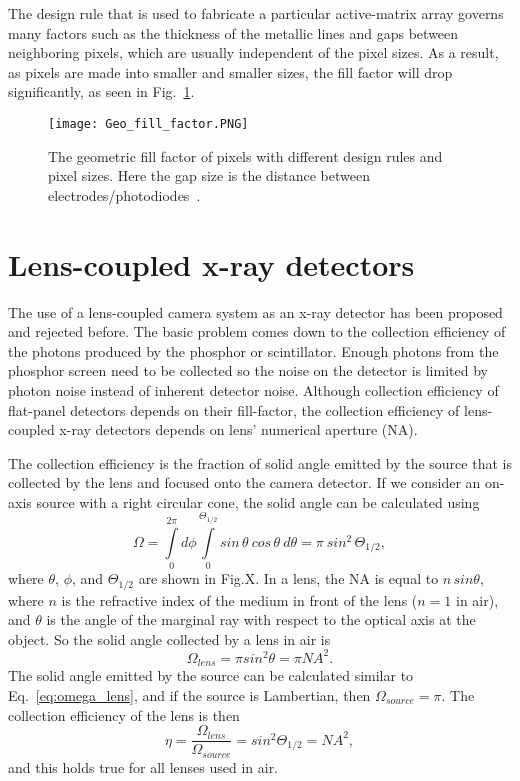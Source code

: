 The design rule that is used to fabricate a particular active-matrix array governs many factors such as the thickness of the metallic lines and gaps between neighboring pixels, which are usually independent of the pixel sizes.  As a result, as pixels are made into smaller and smaller sizes, the fill factor will drop significantly, as seen in Fig.~\ref{fig:fill_factor}.

\begin{figure}[ht]
\texttt{[image: Geo\_fill\_factor.PNG]}
\caption[]{The geometric fill factor of pixels with different design rules and pixel sizes.  Here the gap size is the distance between electrodes/photodiodes\footnotemark ~\citep{Rowlands2000}.}
\label{fig:fill_factor}
\end{figure}

\section{Lens-coupled x-ray detectors}
The use of a lens-coupled camera system as an x-ray detector has been proposed and rejected before.  The basic problem comes down to the collection efficiency of the photons produced by the phosphor or scintillator.  Enough photons from the phosphor screen need to be collected so the noise on the detector is limited by photon noise instead of inherent detector noise.  Although collection efficiency of flat-panel detectors depends on their fill-factor, the collection efficiency of lens-coupled x-ray detectors depends on lens' numerical aperture (NA).

The collection efficiency is the fraction of solid angle emitted by the source that is collected by the lens and focused onto the camera detector.  If we consider an on-axis source with a right circular cone, the solid angle can be calculated using
%
\begin{equation}
\label{eq:omega_lens}
\Omega = \int\limits_0^{2\pi} d \phi 
				\int\limits_0^{\Theta_{1/2}} sin \, \theta \ cos\, \theta \ d\theta = \pi \ sin^2 \, \Theta_{1/2},
\end{equation}
%
where $\theta$, $\phi$, and $\Theta_{1/2}$ are shown in Fig.X.  In a lens, the NA is equal to $n \, sin \theta$, where $n$ is the refractive index of the medium in front of the lens ($n = 1$ in air), and $\theta$ is the angle of the marginal ray with respect to the optical axis at the object.  So the solid angle collected by a lens in air is
%
\begin{equation}
\Omega_{lens} = \pi sin^2 \theta = \pi NA^2.
\end{equation}
%
The solid angle emitted by the source can be calculated similar to Eq.~\ref{eq:omega_lens}, and if the source is Lambertian, then $\Omega_{source} =  \pi$.  The collection efficiency of the lens is then
%
\begin{equation}
\label{eq:lens_collection_efficiency_all}
\eta = \frac{\Omega_{lens}}{\Omega_{source}} = sin^2 \Theta_{1/2} = NA^2,
\end{equation}
%
and this holds true for all lenses used in air.

